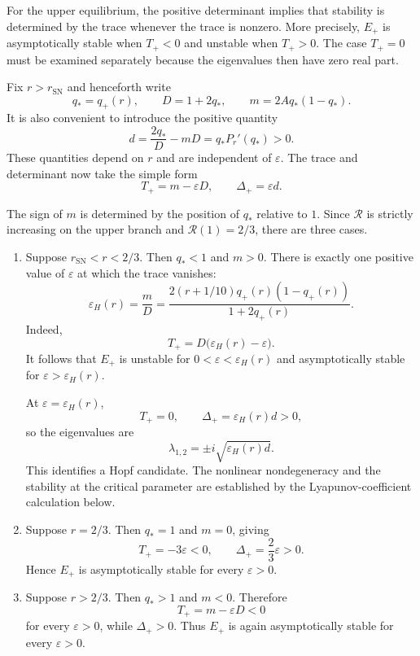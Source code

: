 \documentclass[11pt,reqno]{amsart}
\theoremstyle{plain}
\theoremstyle{definition}
\theoremstyle{remark}
\begin{document}
For the upper equilibrium, the positive determinant implies
that stability is determined by the trace whenever the trace
is nonzero. More precisely, $E_+$ is asymptotically stable
when $T_+<0$ and unstable when $T_+>0$. The case $T_+=0$
must be examined separately because the eigenvalues then
have zero real part.

Fix $r>r_{\mathrm{SN}}$ and henceforth write
\[
q_*=q_+(r),
\qquad
D=1+2q_*,
\qquad
m=2Aq_*(1-q_*).
\]
It is also convenient to introduce the positive quantity
\[
d
=
\frac{2q_*}{D}-mD
=
q_*P_r'(q_*)>0.
\]
These quantities depend on $r$ and are independent of
$\varepsilon$. The trace and determinant now take the simple
form
\[
T_+=m-\varepsilon D,
\qquad
\Delta_+=\varepsilon d.
\]

The sign of $m$ is determined by the position of $q_*$
relative to $1$. Since $\mathcal R$ is strictly increasing
on the upper branch and $\mathcal R(1)=2/3$, there are
three cases.

\begin{enumerate}
\item
Suppose $r_{\mathrm{SN}}<r<2/3$. Then $q_*<1$ and $m>0$.
There is exactly one positive value of $\varepsilon$ at
which the trace vanishes:
\begin{equation}
\varepsilon_H(r)
=
\frac{m}{D}
=
\frac{
2(r+1/10)q_+(r)(1-q_+(r))
}{
1+2q_+(r)
}.
\label{eq:bl-Hopf-curve}
\end{equation}
Indeed,
\[
T_+
=
D\bigl(\varepsilon_H(r)-\varepsilon\bigr).
\]
It follows that $E_+$ is unstable for
$0<\varepsilon<\varepsilon_H(r)$ and asymptotically stable
for $\varepsilon>\varepsilon_H(r)$.

At $\varepsilon=\varepsilon_H(r)$,
\[
T_+=0,
\qquad
\Delta_+=\varepsilon_H(r)d>0,
\]
so the eigenvalues are
\[
\lambda_{1,2}
=
\pm i\sqrt{\varepsilon_H(r)d}.
\]
This identifies a Hopf candidate. The nonlinear
nondegeneracy and the stability at the critical parameter
are established by the Lyapunov-coefficient calculation
below.

\item
Suppose $r=2/3$. Then $q_*=1$ and $m=0$, giving
\[
T_+=-3\varepsilon<0,
\qquad
\Delta_+=\frac{2}{3}\varepsilon>0.
\]
Hence $E_+$ is asymptotically stable for every
$\varepsilon>0$.

\item
Suppose $r>2/3$. Then $q_*>1$ and $m<0$. Therefore
\[
T_+=m-\varepsilon D<0
\]
for every $\varepsilon>0$, while $\Delta_+>0$.
Thus $E_+$ is again asymptotically stable for every
$\varepsilon>0$.
\end{enumerate}
\end{document}
